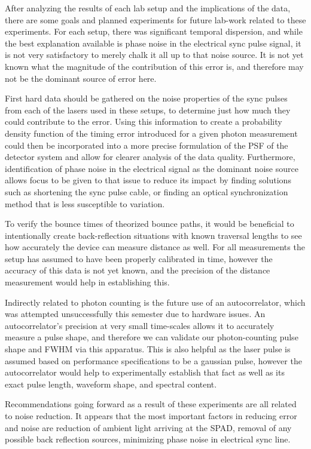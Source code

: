 \documentclass[a4paper]{article}
\begin{document}
After analyzing the results of each lab setup and the implications of the data, there are some goals and planned experiments for future lab-work related to these experiments. For each setup, there was significant temporal dispersion, and while the best explanation available is phase noise in the electrical sync pulse signal, it is not very satisfactory to merely chalk it all up to that noise source. It is not yet known what the magnitude of the contribution of this error is, and therefore may not be the dominant source of error here.

First hard data should be gathered on the noise properties of the sync pulses from each of the lasers used in these setups, to determine just how much they could contribute to the error. Using this information to create a probability density function of the timing error introduced for a given photon measurement could then be incorporated into a more precise formulation of the PSF of the detector system and allow for clearer analysis of the data quality. Furthermore, identification of phase noise in the electrical signal as the dominant noise source allows focus to be given to that issue to reduce its impact by finding solutions such as shortening the sync pulse cable, or finding an optical synchronization method that is less susceptible to variation.

To verify the bounce times of theorized bounce paths, it would be beneficial to intentionally create back-reflection situations with known traversal lengths to see how accurately the device can measure distance as well. For all measurements the setup has assumed to have been properly calibrated in time, however the accuracy of this data is not yet known, and the precision of the distance measurement would help in establishing this.

Indirectly related to photon counting is the future use of an autocorrelator, which was attempted unsuccessfully this semester due to hardware issues. An autocorrelator's precision at very small time-scales allows it to accurately measure a pulse shape, and therefore we can validate our photon-counting pulse shape and FWHM via this apparatus. This is also helpful as the laser pulse is assumed based on performance specifications to be a gaussian pulse, however the autocorrelator would help to experimentally establish that fact as well as its exact pulse length, waveform shape, and spectral content.

Recommendations going forward as a result of these experiments are all related to noise reduction. It appears that the most important factors in reducing error and noise are reduction of ambient light arriving at the SPAD, removal of any possible back reflection sources, minimizing phase noise in electrical sync line.
\end{document}
